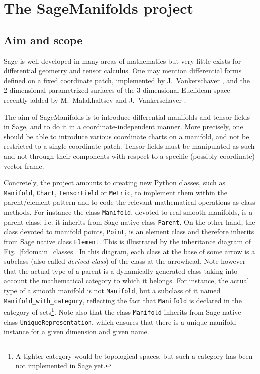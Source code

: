 \documentclass[a4paper]{jpconf}
\newcommand{\soft}[1]{\textsf{#1}}
\newcommand{\code}[1]{\texttt{#1}}
\newcommand{\Sage}{\soft{Sage}}
\newcommand{\SM}{\soft{SageManifolds}}
\begin{document}

\section{The SageManifolds project}

\subsection{Aim and scope}

\Sage{} is well developed in many areas of mathematics but 
very little exists for differential geometry and tensor calculus.
One may mention differential forms defined on a fixed coordinate patch,
implemented by J.~Vankerschaver \cite{sage_diff_form},
and the 2-dimensional parametrized surfaces of
the 3-dimensional Euclidean space recently added
 by M.~Malakhaltsev and J.~Vankerschaver
\cite{sage_param_surf}. 

The aim of \SM{} \cite{SM} is to introduce differential manifolds and tensor fields
in \Sage{}, and to do it in a coordinate-independent manner. 
More precisely, one should be able to introduce various coordinate charts
on a manifold, and not be restricted to a single coordinate patch. 
Tensor fields must be manipulated as such and not through 
their components with respect to a specific (possibly coordinate) vector frame. 

Concretely, the project amounts to creating new Python classes,
 such as 
\code{Manifold}, \code{Chart}, \code{TensorField} or \code{Metric},
to implement them within the parent/element pattern and to 
code the relevant mathematical operations as class methods.
For instance the class \code{Manifold}, devoted to real smooth manifolds,
is a parent class, i.e. it inherits from Sage native class \code{Parent}.
On the other hand, the class devoted to manifold points, \code{Point}, 
is an element class and therefore inherits from Sage native class 
\code{Element}.
This is illustrated by the inheritance diagram of Fig.~\ref{f:domain_classes}.
In this diagram, each class at the base of some arrow is a subclass (also
called \emph{derived class}) of the class at the arrowhead.
Note however that the actual type of a parent is a dynamically generated
class taking into account the mathematical category to which it belongs. 
For instance, the actual type of a smooth manifold is not \code{Manifold}, but a
subclass of it named \code{Manifold\_with\_category}, 
reflecting the fact that \code{Manifold} is
declared in the category of sets\footnote{A tighter category would be
topological spaces, but such a category has been not implemented in \Sage{} yet.}.
Note also that the class \code{Manifold} inherits from \Sage{} native class
\texttt{UniqueRepresentation}, which ensures that there is a unique
manifold instance for a given dimension and given name. 
\end{document}
